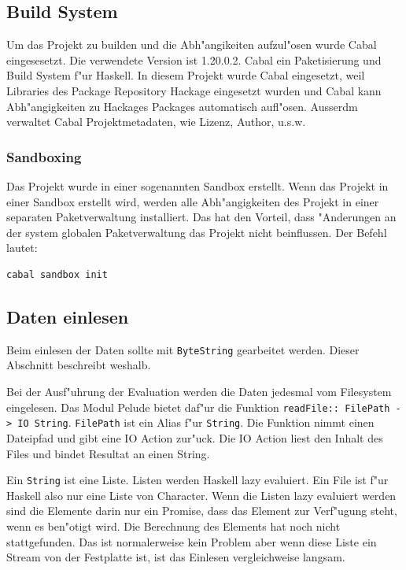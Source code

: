 \documentclass[a4paper, 12pt]{article}
\begin{document}
\subsection{Build System}
\label{sec:cabal}

Um das Projekt zu builden und die Abh"angikeiten aufzul"osen wurde Cabal eingesesetzt. Die verwendete Version ist 1.20.0.2. Cabal ein Paketisierung und Build System f"ur Haskell. In diesem Projekt wurde Cabal eingesetzt, weil Libraries des Package Repository Hackage eingesetzt wurden und Cabal kann Abh"angigkeiten zu Hackages Packages automatisch aufl"osen. Ausserdm verwaltet Cabal Projektmetadaten, wie Lizenz, Author, u.s.w.

\subsubsection{Sandboxing}
\label{sec:sanboxing}

Das Projekt wurde in einer sogenannten Sandbox erstellt. Wenn das Projekt in einer Sandbox erstellt wird, werden alle Abh"angigkeiten des Projekt in einer separaten Paketverwaltung installiert. Das hat den Vorteil, dass "Anderungen an der system globalen Paketverwaltung das Projekt nicht beinflussen. Der Befehl lautet:
\begin{verbatim}
cabal sandbox init
\end{verbatim}

\subsection{Daten einlesen}
\label{sec:readio}

Beim einlesen der Daten sollte mit \verb|ByteString| gearbeitet werden. Dieser Abschnitt beschreibt weshalb.

Bei der Ausf"uhrung der Evaluation werden die Daten jedesmal vom Filesystem eingelesen. Das Modul Pelude bietet daf"ur die Funktion \verb|readFile:: FilePath -> IO String|. \verb|FilePath| ist ein Alias f"ur \verb|String|. Die Funktion nimmt einen Dateipfad und gibt eine IO Action zur"uck. Die IO Action liest den Inhalt des Files und bindet Resultat an einen String.

Ein \verb|String| ist eine Liste. Listen werden Haskell lazy evaluiert. Ein File ist f"ur Haskell also nur eine Liste von Character. Wenn die Listen lazy evaluiert werden sind die Elemente darin nur ein Promise, dass das Element zur Verf"ugung steht, wenn es ben"otigt wird. Die Berechnung des Elements hat noch nicht stattgefunden. Das ist normalerweise kein Problem aber wenn diese Liste ein Stream von der Festplatte ist, ist das Einlesen vergleichweise langsam.
\end{document}
